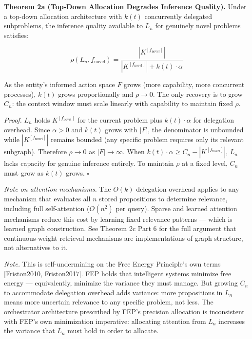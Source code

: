 \documentclass[
]{article}
\begin{document}
\textbf{Theorem 2a (Top-Down Allocation Degrades Inference Quality).}
Under a top-down allocation architecture with \(k(t)\) concurrently
delegated subproblems, the inference quality available to \(L_n\) for
genuinely novel problems satisfies:

\[\rho(L_n, f_{\text{novel}}) = \frac{|K^{[f_{\text{novel}}]}|}{|K^{[f_{\text{novel}}]}| + k(t)\cdot\alpha}\]

As the entity's informed action space \(F\) grows (more capability, more
concurrent processes), \(k(t)\) grows proportionally and \(\rho \to 0\).
The only recovery is to grow \(C_n\): the context window must scale
linearly with capability to maintain fixed \(\rho\).

\emph{Proof.} \(L_n\) holds \(K^{[f_{\text{novel}}]}\) for the current
problem plus \(k(t)\cdot\alpha\) for delegation overhead. Since
\(\alpha > 0\) and \(k(t)\) grows with \(|F|\), the denominator is
unbounded while \(|K^{[f_{\text{novel}}]}|\) remains bounded (any
specific problem requires only its relevant subgraph). Therefore
\(\rho \to 0\) as \(|F| \to \infty\). When
\(k(t)\cdot\alpha \geq C_n - |K^{[f_{\text{novel}}]}|\), \(L_n\) lacks
capacity for genuine inference entirely. To maintain \(\rho\) at a fixed
level, \(C_n\) must grow as \(k(t)\) grows. \(\square\)

\emph{Note on attention mechanisms.} The \(O(k)\) delegation overhead
applies to any mechanism that evaluates all \(n\) stored propositions to
determine relevance, including full self-attention (\(O(n^2)\) per
query). Sparse and learned attention mechanisms reduce this cost by
learning fixed relevance patterns --- which is learned graph
construction. See Theorem 2c Part 6 for the full argument that
continuous-weight retrieval mechanisms are implementations of graph
structure, not alternatives to it.

\emph{Note.} This is self-undermining on the Free Energy Principle's own
terms {[}Friston2010, Friston2017{]}. FEP holds that intelligent systems
minimize free energy --- equivalently, minimize the variance they must
manage. But growing \(C_n\) to accommodate delegation overhead adds
variance: more propositions in \(L_n\) means more uncertain relevance to
any specific problem, not less. The orchestrator architecture prescribed
by FEP's precision allocation is inconsistent with FEP's own
minimization imperative: allocating attention from \(L_n\) increases the
variance that \(L_n\) must hold in order to allocate.
\end{document}
